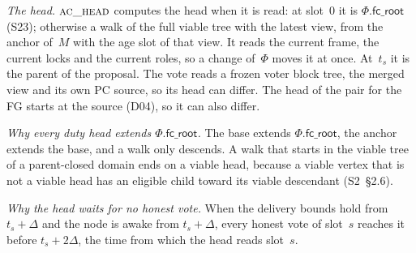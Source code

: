 \documentclass{article}
\newcommand{\Fr}{\Phi}
\newcommand{\fcroot}{\mathsf{fc\_root}}
\begin{document}
\emph{The head.}  $\Call{ac\_head}{}$ computes the head when it is read: at
slot~$0$ it is $\Fr.\fcroot$ (S23); otherwise a walk of the full viable
tree with the latest view, from the anchor of~$M$ with the age slot of
that view.  It reads the current frame, the current locks and the current
roles, so a change of~$\Fr$ moves it at once.  At~$t_s$ it is the parent
of the proposal.  The vote reads a frozen voter block tree, the merged view
and its own PC source, so its head can differ.  The head of the pair for
the FG starts at the source (D04), so it can also differ.

\emph{Why every duty head extends $\Fr.\fcroot$.}  The base extends
$\Fr.\fcroot$, the anchor extends the base, and a walk only descends.  A
walk that starts in the viable tree of a parent-closed domain ends on a
viable head, because a viable vertex that is not a viable head has an
eligible child toward its viable descendant (S2~\S2.6).

\emph{Why the head waits for no honest vote.}  When the delivery bounds
hold from $t_s+\Delta$ and the node is awake from $t_s+\Delta$, every honest
vote of slot~$s$ reaches it before $t_s+2\Delta$, the time from which the
head reads slot~$s$.
\end{document}
